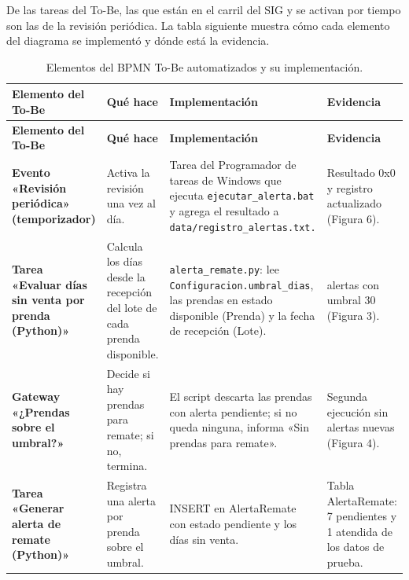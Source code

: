 \documentclass[11pt,letterpaper]{article}
\begin{document}
De las tareas del To-Be, las que están en el carril del SIG y se activan por tiempo son las de la revisión periódica. La tabla siguiente muestra cómo cada elemento del diagrama se implementó y dónde está la evidencia.
{\scriptsize
\setlength{\tabcolsep}{3pt}\renewcommand{\arraystretch}{1.15}
\begin{longtable}{>{\raggedright\arraybackslash}p{}>{\raggedright\arraybackslash}p{}>{\raggedright\arraybackslash}p{}>{\raggedright\arraybackslash}p{}}
\caption{Elementos del BPMN To-Be automatizados y su implementación.}\\
\hline
\rowcolor[HTML]{D9EAF7}\textbf{\textbf{Elemento del To-Be}} & \textbf{\textbf{Qué hace}} & \textbf{\textbf{Implementación}} & \textbf{\textbf{Evidencia}} \\
\hline
\endfirsthead
\hline
\rowcolor[HTML]{D9EAF7}\textbf{\textbf{Elemento del To-Be}} & \textbf{\textbf{Qué hace}} & \textbf{\textbf{Implementación}} & \textbf{\textbf{Evidencia}} \\
\hline
\endhead
\textbf{Evento «Revisión periódica» (temporizador)} & Activa la revisión una vez al día. & Tarea del Programador de tareas de Windows que ejecuta \texttt{ejecutar\_\allowbreak{}alerta.bat} y agrega el resultado a \texttt{data/\allowbreak{}registro\_\allowbreak{}alertas.txt.} & Resultado 0x0 y registro actualizado (Figura 6). \\
\hline
\textbf{Tarea «Evaluar días sin venta por prenda (Python)»} & Calcula los días desde la recepción del lote de cada prenda disponible. & \texttt{alerta\_\allowbreak{}remate.py}: lee \texttt{Configuracion.umbral\_\allowbreak{}dias}, las prendas en estado disponible (Prenda) y la fecha de recepción (Lote). & 7 alertas con umbral 30 (Figura 3). \\
\hline
\textbf{Gateway «¿Prendas sobre el umbral?»} & Decide si hay prendas para remate; si no, termina. & El script descarta las prendas con alerta pendiente; si no queda ninguna, informa «Sin prendas para remate». & Segunda ejecución sin alertas nuevas (Figura 4). \\
\hline
\textbf{Tarea «Generar alerta de remate (Python)»} & Registra una alerta por prenda sobre el umbral. & INSERT en AlertaRemate con estado pendiente y los días sin venta. & Tabla AlertaRemate: 7 pendientes y 1 atendida de los datos de prueba. \\

\end{longtable}}
\end{document}
